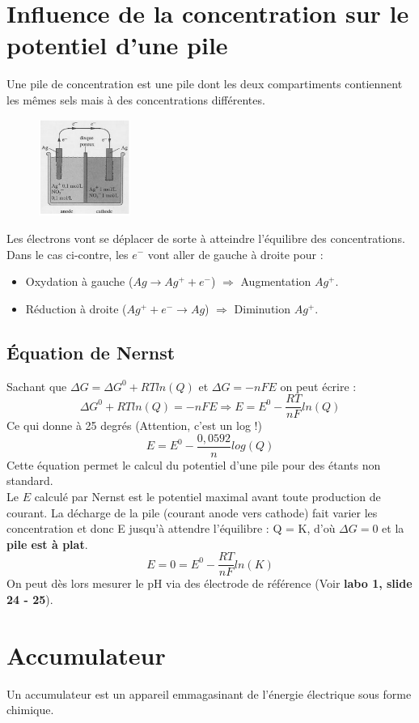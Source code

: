 \documentclass[british,french,11pt, a4paper, openany]{book}
\begin{document}
\section{Influence de la concentration sur le potentiel d'une pile}
Une pile de concentration est une pile dont les deux compartiments contiennent les mêmes sels mais à des concentrations différentes. 
\begin{figure}
	\includegraphics[width=3cm]{image3.png}
\end{figure}

Les électrons vont se déplacer de sorte à atteindre l'équilibre des concentrations. Dans le cas ci-contre, les $e^-$ vont aller de gauche à droite pour :
\begin{itemize}
	\item Oxydation à gauche ($Ag \rightarrow Ag^+ + e^-$) $\Rightarrow$ Augmentation $Ag^+$.
	\item Réduction à droite ($Ag^+ +e^- \rightarrow Ag$) $\Rightarrow$ Diminution $Ag^+$.
\end{itemize}
\subsection*{Équation de Nernst}
Sachant que $\Delta G = \Delta G^0 + RTln(Q)$ et $\Delta G = -nFE$ on peut écrire : 
$$\Delta G^0 + RTln(Q) = -nFE \Rightarrow E = E^0 - \frac{RT}{nF}ln(Q)$$
Ce qui donne à 25 degrés (Attention, c'est un log !)
$$E = E^0 - \frac{0,0592}{n}log(Q)$$
Cette équation permet le calcul du potentiel d'une pile pour des étants non standard.\\

Le $E$ calculé par Nernst est le potentiel maximal avant toute production de courant. La décharge de la pile (courant anode vers cathode) fait varier les concentration et donc E jusqu'à attendre l'équilibre : Q = K, d'où $\Delta G = 0$ et la \textbf{pile est à plat}.
$$E = 0 = E^0 - \frac{RT}{nF}ln(K)$$
On peut dès lors mesurer le pH via des électrode de référence (Voir \textbf{labo 1, slide 24 - 25}).

\section{Accumulateur}
Un accumulateur est un appareil emmagasinant de l'énergie électrique sous forme chimique.
\end{document}
